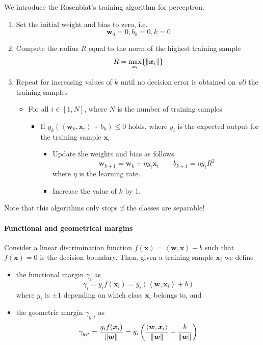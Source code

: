 \documentclass[oneside,onecolumn]{report}
\newcommand{\inp}[2]{\left\langle #1, #2 \right\rangle}
\begin{document}
We introduce the Rosenblat's training algorithm for perceptron.
\begin{enumerate}
    \item Set the initial weight and bias to zero, i.e.
    $$ \bm w_0 = 0, b_0 = 0, k = 0 $$

    \item Compute the radius $R$ equal to the norm of the highest training sample
    $$ R = \max_{\bm x_i}\{\norm{\bm x_i}\} $$

    \item Repeat for increasing values of $k$ until no decision error is obtained on \emph{all} the training samples
    \begin{itemize}
        \item For all $i \in [1, N]$, where $N$ is the number of training samples
        \begin{itemize}[label=\textbullet]
            \item If $y_k (\inp{\bm w_k}{\bm x_i} + b_k) \leq 0$ holds, where $y_i$ is the expected output for the training sample $\bm x_i$
            \begin{itemize}[label=\textbullet]
                \item Update the weights and bias as follows
                $$ \bm w_{k + 1} = \bm w_k + \eta y_i \bm x_i \qquad b_{k + 1} = \eta y_i R^2 $$
                where $\eta$ is the learning rate.
                \item Increase the value of $k$ by 1.
            \end{itemize}
        \end{itemize}
    \end{itemize}
\end{enumerate}

Note that this algorithms only stops if the classes are separable!

\paragraph{Functional and geometrical margins}
Consider a linear discrimination function $f(\bm x) = \inp{\bm w}{\bm x} + b$ such that $f(\bm x) = 0$ is the decision boundary.
Then, given a training sample $\bm x_i$ we define
\begin{itemize}
    \item the functional margin $\gamma_i$ as
    $$ \gamma_i = y_i f(\bm x_i) = y_i (\inp{\bm w}{\bm x_i} + b) $$
    where $y_i$ is $\pm 1$ depending on which class $\bm x_i$ belongs to, and

    \item the geometric margin $\gamma_{g, i}$ as
    $$ \gamma_{g, i} = \frac{y_i f(\bm x_i)}{\norm{\bm w}} = y_i \left( \frac{\inp{\bm w}{\bm x_i}}{\norm {\bm w}} + \frac{b}{\norm{\bm w}} \right) $$
\end{itemize}
\end{document}
